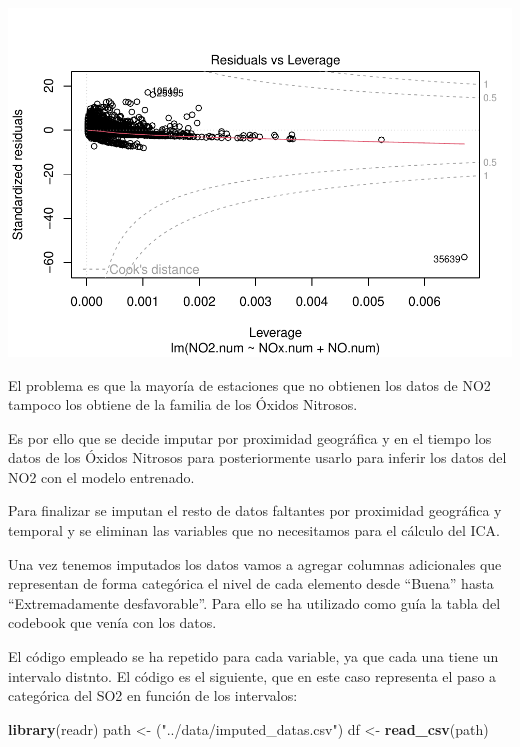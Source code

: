 \documentclass[notspecified,article,submit,moreauthors,pdftex]{Definitions/mdpi}
\newenvironment{Shaded}{\begin{snugshade}}{\end{snugshade}}
\newcommand{\FunctionTok}[1]{\textcolor[rgb]{0.13,0.29,0.53}{\textbf{#1}}}
\newcommand{\NormalTok}[1]{#1}
\newcommand{\OtherTok}[1]{\textcolor[rgb]{0.56,0.35,0.01}{#1}}
\newcommand{\StringTok}[1]{\textcolor[rgb]{0.31,0.60,0.02}{#1}}
\begin{document}
\includegraphics{ProyectoAED2023_files/figure-latex/unnamed-chunk-14-4.pdf}

El problema es que la mayoría de estaciones que no obtienen los datos de
NO2 tampoco los obtiene de la familia de los Óxidos Nitrosos.

Es por ello que se decide imputar por proximidad geográfica y en el
tiempo los datos de los Óxidos Nitrosos para posteriormente usarlo para
inferir los datos del NO2 con el modelo entrenado.

Para finalizar se imputan el resto de datos faltantes por proximidad
geográfica y temporal y se eliminan las variables que no necesitamos
para el cálculo del ICA.

Una vez tenemos imputados los datos vamos a agregar columnas adicionales
que representan de forma categórica el nivel de cada elemento desde
``Buena'' hasta ``Extremadamente desfavorable''. Para ello se ha
utilizado como guía la tabla del codebook que venía con los datos.

El código empleado se ha repetido para cada variable, ya que cada una
tiene un intervalo distnto. El código es el siguiente, que en este caso
representa el paso a categórica del SO2 en función de los intervalos:

\begin{Shaded}
\begin{Highlighting}[]
\FunctionTok{library}\NormalTok{(readr)}
\NormalTok{path }\OtherTok{\textless{}{-}}\NormalTok{ (}\StringTok{"../data/imputed\_datas.csv"}\NormalTok{)}
\NormalTok{df }\OtherTok{\textless{}{-}} \FunctionTok{read\_csv}\NormalTok{(path)}
\end{Highlighting}
\end{Shaded}
\end{document}
